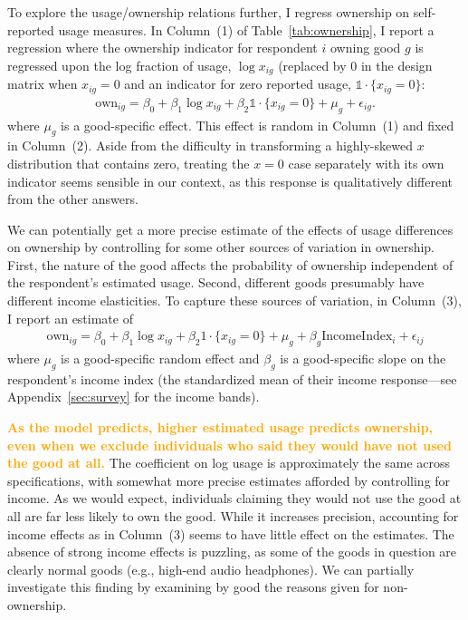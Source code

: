 \documentclass[11pt]{article}
\newcommand{\important}[1]{\textcolor{orange}{\textbf{#1}}}
\newcommand{\important}[1]{#1}
\begin{document}
To explore the usage/ownership relations further, I regress ownership on self-reported usage measures. 
In Column~(1) of Table~\ref{tab:ownership}, I report a regression where the ownership indicator for respondent $i$ owning good $g$  is regressed upon the log fraction of usage, $\log x_{ig}$ (replaced by $0$ in the design matrix when $x_{ig} = 0$ and an indicator for zero reported usage, $\mathbb{1}\cdot\{x_{ig} = 0\}$:  
\begin{align} \label{eq:base_own}
\mbox{own}_{ig} = \beta_0 + \beta_1 \log x_{ig} + \beta_2 \mathbb{1}\cdot\{x_{ig} = 0\} + \mu_{g} + \epsilon_{ig}.
\end{align} 
where $\mu_g$ is a good-specific effect. 
This effect is random in Column~(1) and fixed in Column~(2).
Aside from the difficulty in transforming a highly-skewed $x$ distribution that contains zero, treating the $x = 0$ case separately with its own indicator seems sensible in our context, as this response is qualitatively different from the other answers. 

We can potentially get a more precise estimate of the effects of usage differences on ownership by controlling for some other sources of variation in ownership. 
First, the nature of the good affects the probability of ownership independent of the respondent's estimated usage. 
Second, different goods presumably have different income elasticities.  
To capture these sources of variation, in Column~(3), I report an estimate of 
\begin{align} \label{eq:usage_and_income}
\mbox{own}_{ig} = \beta_0 + \beta_1 \log x_{ig} + \beta_2 1\cdot\{x_{ig} = 0\} + \mu_g + \beta_g \mbox{IncomeIndex}_i + \epsilon_{ij}  
\end{align} 
where $\mu_g$ is a good-specific random effect and $\beta_g$ is a good-specific slope on the respondent's income index (the standardized mean of their income response---see Appendix~\ref{sec:survey} for the income bands). 



\important{As the model predicts, higher estimated usage predicts ownership, even when we exclude individuals who said they would have not used the good at all.} 
The coefficient on log usage is approximately the same across specifications, with somewhat more precise estimates afforded by controlling for income. 
As we would expect, individuals claiming they would not use the good at all are far less likely to own the good. 
While it increases precision, accounting for income effects as in Column~(3) seems to have little effect on the estimates. 
The absence of strong income effects is puzzling, as some of the goods in question are clearly normal goods (e.g., high-end audio headphones). 
We can partially investigate this finding by examining by good the reasons given for non-ownership. 
\end{document}
